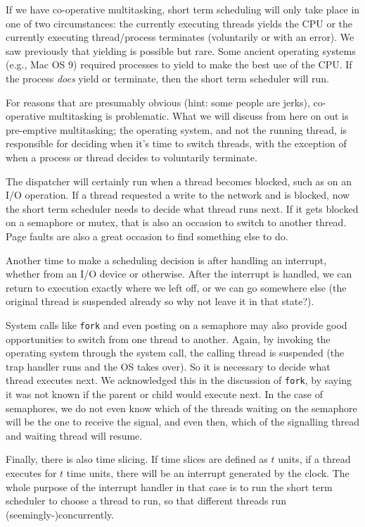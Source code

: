 If we have co-operative multitasking, short term scheduling will only take place in one of two circumstances: the currently executing threads yields the CPU or the currently executing thread/process terminates (voluntarily or with an error). We saw previously that yielding is possible but rare. Some ancient operating systems (e.g., Mac OS 9) required processes to yield to make the best use of the CPU. If the process \textit{does} yield or terminate, then the short term scheduler will run.

For reasons that are presumably obvious (hint: some people are jerks), co-operative multitasking is problematic. What we will discuss from here on out is pre-emptive multitasking; the operating system, and not the running thread, is responsible for deciding when it's time to switch threads, with the exception of when a process or thread decides to voluntarily terminate.

The dispatcher will certainly run when a thread becomes blocked, such as on an I/O operation. If a thread requested a write to the network and is blocked, now the short term scheduler needs to decide what thread runs next. If it gets blocked on a semaphore or mutex, that is also an occasion to switch to another thread. Page faults are also a great occasion to find something else to do.

Another time to make a scheduling decision is after handling an interrupt, whether from an I/O device or otherwise. After the interrupt is handled, we can return to execution exactly where we left off, or we can go somewhere else (the original thread is suspended already so why not leave it in that state?). 

System calls like \texttt{fork} and even posting on a semaphore may also provide good opportunities to switch from one thread to another. Again, by invoking the operating system through the system call, the calling thread is suspended (the trap handler runs and the OS takes over). So it is necessary to decide what thread executes next. We acknowledged this in the discussion of \texttt{fork}, by saying it was not known if the parent or child would execute next. In the case of semaphores, we do not even know which of the threads waiting on the semaphore will be the one to receive the signal, and even then, which of the signalling thread and waiting thread will resume.

Finally, there is also time slicing. If time slices are defined as $t$ units, if a thread executes for $t$ time units, there will be an interrupt generated by the clock. The whole purpose of the interrupt handler in that case is to run the short term scheduler to choose a thread to run, so that different threads run (seemingly-)concurrently.

